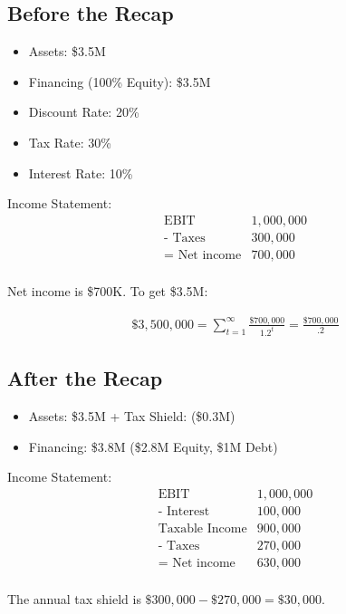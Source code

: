 \subsection*{Before the Recap}
\begin{itemize}
    \item Assets: \$3.5M
    \item Financing (100\% Equity): \$3.5M
    \item Discount Rate: 20\%
    \item Tax Rate: 30\%
    \item Interest Rate: 10\%
\end{itemize}


Income Statement:
\[
\begin{array}{lr}
    \text{EBIT} & 1,000,000 \\
    \text{- Taxes} & 300,000 \\
    \hline
    \text{= Net income} & 700,000 \\
\end{array}
\]


Net income is \$700K.
To get \$3.5M:

\begin{align*}
    \$ 3,500,000 = \sum^{\infty}_{t=1}\frac{\$700,000}{1.2^t} = \frac{\$700,000}{.2}
\end{align*}


\subsection*{After the Recap}
\begin{itemize}
    \item Assets: \$3.5M + Tax Shield: (\$0.3M)  
    \item Financing: \$3.8M (\$2.8M Equity, \$1M Debt)
\end{itemize}

Income Statement:
\[
\begin{array}{lr}
    \text{EBIT} & 1,000,000 \\
    \text{- Interest} & 100,000 \\
    \text{Taxable Income} & 900,000 \\
    \text{- Taxes} & 270,000 \\
    \hline
    \text{= Net income} & 630,000 \\
\end{array}
\]

The annual tax shield is $\$300,000-\$270,000 = \$30,000$.

